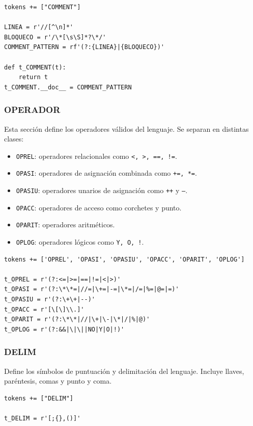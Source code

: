 \documentclass{article}
\begin{document}
\begin{lstlisting}[style=mypython]
tokens += ["COMMENT"]

LINEA = r'//[^\n]*'
BLOQUECO = r'/\*[\s\S]*?\*/'
COMMENT_PATTERN = rf'(?:{LINEA}|{BLOQUECO})'

def t_COMMENT(t):
    return t
t_COMMENT.__doc__ = COMMENT_PATTERN
\end{lstlisting}


\subsubsection{OPERADOR}

Esta sección define los operadores válidos del lenguaje. Se separan en distintas clases:

\begin{itemize}
  \item \texttt{OPREL}: operadores relacionales como \texttt{<, >, ==, !=}.
  \item \texttt{OPASI}: operadores de asignación combinada como \texttt{+=, *=}.
  \item \texttt{OPASIU}: operadores unarios de asignación como \texttt{++} y \texttt{--}.
  \item \texttt{OPACC}: operadores de acceso como corchetes y punto.
  \item \texttt{OPARIT}: operadores aritméticos.
  \item \texttt{OPLOG}: operadores lógicos como \texttt{Y, O, !}.
\end{itemize}

\begin{lstlisting}[style=mypython]
tokens += ['OPREL', 'OPASI', 'OPASIU', 'OPACC', 'OPARIT', 'OPLOG']

t_OPREL = r'(?:<=|>=|==|!=|<|>)'
t_OPASI = r'(?:\*\*=|//=|\+=|-=|\*=|/=|%=|@=|=)'
t_OPASIU = r'(?:\+\+|--)'
t_OPACC = r'[\[\]\\.]'
t_OPARIT = r'(?:\*\*|//|\+|\-|\*|/|%|@)'
t_OPLOG = r'(?:&&|\|\||NO|Y|O|!)'
\end{lstlisting}

\subsubsection{DELIM}

Define los símbolos de puntuación y delimitación del lenguaje. Incluye llaves, paréntesis, comas y punto y coma.

\begin{lstlisting}[style=mypython]
tokens += ["DELIM"]

t_DELIM = r'[;{},()]'
\end{lstlisting}
\end{document}

